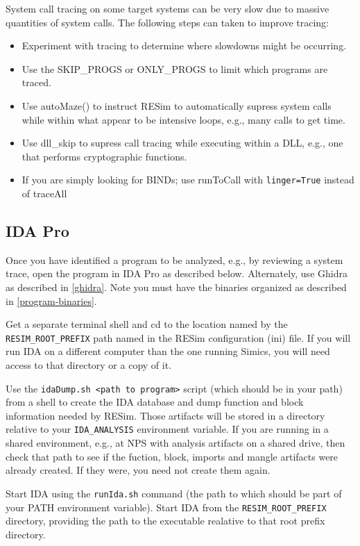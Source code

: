 \documentclass[titlepage]{article}
\begin{document}
System call tracing on some target systems can be very slow due to massive quantities of system calls.  The following steps can taken to improve tracing:

\begin{itemize}
\item Experiment with tracing to determine where slowdowns might be occurring.
\item Use the SKIP\_PROGS or ONLY\_PROGS to limit which programs are traced.
\item Use autoMaze() to instruct RESim to automatically supress system calls while within what appear to be intensive loops, e.g., many calls to get time.
\item Use dll\_skip to supress call tracing while executing within a DLL, e.g., one that performs cryptographic functions.
\item If you are simply looking for BINDs; use runToCall with {\tt linger=True} instead of traceAll
\end{itemize}


\subsection{IDA Pro}
\label{ida}
Once you have identified a program to be analyzed, e.g., by reviewing a system trace, open the program in IDA Pro as described below.
Alternately, use Ghidra as described in \ref{ghidra}.  Note you must have the binaries organized as described in \ref{program-binaries}.

Get a separate terminal shell and cd to the location named by the {\tt RESIM\_ROOT\_PREFIX} path named in the RESim configuration (ini) file.  
If you will run IDA on a different computer than the one running Simics, you will need access to that directory or a copy of it.

Use the {\tt idaDump.sh <path to program>} script (which should be in your path) from a shell to create the IDA database and dump function and block information
needed by RESim.  Those artifacts will be stored in a directory relative to your {\tt IDA\_ANALYSIS} environment variable.
If you are running in a shared environment, e.g., at NPS with analysis artifacts on a shared drive, then 
check that path to see if the fuction, block, imports and mangle artifacts were already created.  If they were, you need not create them again.

Start IDA using the {\tt runIda.sh} command (the path to which should be part of your PATH environment variable).  Start IDA from the
{\tt RESIM\_ROOT\_PREFIX} directory, providing the path to the executable realative to that root prefix directory.
\end{document}
